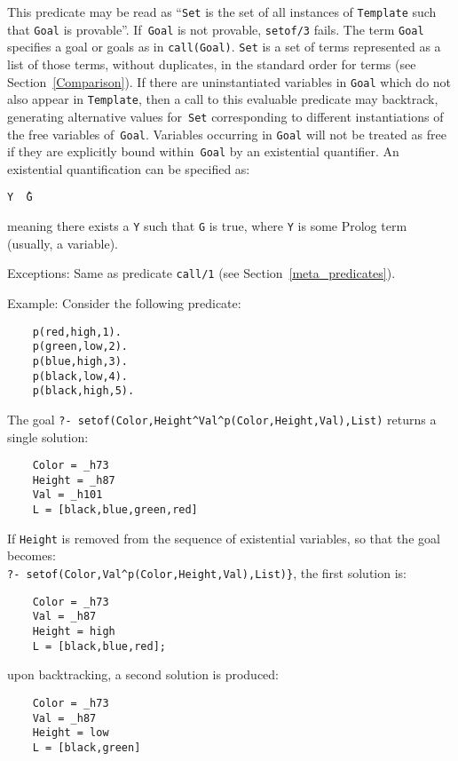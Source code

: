 \begin{description}
    This predicate may be read as ``{\tt Set} is the set of all instances 
    of {\tt Template} such that {\tt Goal} is provable''.
    If~{\tt Goal} is not provable, {\tt setof/3} fails.
    The term {\tt Goal} specifies a goal or goals as in {\tt call(Goal)}.
    {\tt Set} is a set of terms represented as a list of those terms,
    without duplicates, in the standard order for terms 
    (see Section~\ref{Comparison}).
    If there are uninstantiated variables in {\tt Goal} which do not also 
    appear in {\tt Template}, then a call to this evaluable predicate may backtrack,
    generating alternative values for~{\tt Set} corresponding to different
    instantiations of the free variables of~{\tt Goal}.
    Variables occurring in {\tt Goal} will not be treated as free if they 
    are explicitly bound within~{\tt Goal} by an existential quantifier.
    An existential quantification can be specified as:
    \begin{center}
    {\tt Y \^\ G}\index{\^}
    \end{center}
    meaning there exists a {\tt Y} such that {\tt G} is true,
    where {\tt Y} is some Prolog term (usually, a variable).
  
    Exceptions: Same as predicate {\tt call/1}
		(see Section~\ref{meta_predicates}).

Example: Consider the following predicate: 
%
\begin{verbatim}
    p(red,high,1).
    p(green,low,2).
    p(blue,high,3).
    p(black,low,4).
    p(black,high,5).
\end{verbatim}
%
The goal \verb|?- setof(Color,Height^Val^p(Color,Height,Val),List)|
returns a single solution:
\begin{verbatim}
    Color = _h73
    Height = _h87
    Val = _h101
    L = [black,blue,green,red]
\end{verbatim}

If {\tt Height} is removed from the sequence of existential variables, so
that the goal becomes:\\
\verb|?- setof(Color,Val^p(Color,Height,Val),List)}|, the first solution is:
\begin{verbatim}
    Color = _h73
    Val = _h87
    Height = high
    L = [black,blue,red];
\end{verbatim}
%
upon backtracking, a second solution is produced: 
%
\begin{verbatim}
    Color = _h73
    Val = _h87
    Height = low
    L = [black,green]
\end{verbatim}


\end{description}
